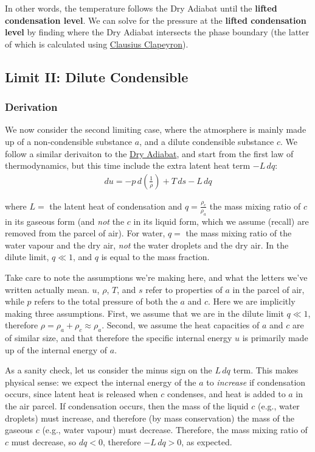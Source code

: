 In other words, the temperature follows the Dry Adiabat until the \textbf{lifted condensation level}. We can solve for the pressure at the \textbf{lifted condensation level} by finding where the Dry Adiabat intersects the phase boundary (the latter of which is calculated using \hyperref[Clausius Clapeyron]{Clausius Clapeyron}).

\subsection{Limit II: Dilute Condensible}

\subsubsection{Derivation}

We now consider the second limiting case, where the atmosphere is mainly made up of a non-condensible substance $a$, and a dilute condensible substance $c$. We follow a similar derivaiton to the \hyperref[Dry Adiabat]{Dry Adiabat}, and start from the first law of thermodynamics, but this time include the extra latent heat term $-L\,dq$:
\begin{align}\label{1st law latent heat}
    du=-p\,d\left(\frac{1}{\rho}\right)+T\,ds-L\,dq
\end{align}

\noindent where $L=$ the latent heat of condensation and $q=\frac{\rho_c}{\rho_a}$ the mass mixing ratio of $c$ in its gaseous form (and \textit{not} the $c$ in its liquid form, which we assume (recall) are removed from the parcel of air). For water, $q=$ the mass mixing ratio of the water vapour and the dry air, \textit{not} the water droplets and the dry air. In the dilute limit, $q\ll 1$, and $q$ is equal to the mass fraction. 

Take care to note the assumptions we're making here, and what the letters we've written actually mean. $u$, $\rho$, $T$,  and $s$ refer to properties of $a$ in the parcel of air, while $p$ refers to the total pressure of both the $a$ and $c$. Here we are implicitly making three assumptions. First, we assume that we are in the dilute limit $q\ll 1$, therefore $\rho=\rho_a+\rho_c\approx\rho_a$. Second, we assume the heat capacities of $a$ and $c$ are of similar size, and that therefore the specific internal energy $u$ is primarily made up of the internal energy of $a$.

As a sanity check, let us consider the minus sign on the $L\,dq$ term. This makes physical sense: we expect the internal energy of the $a$ to \textit{increase} if condensation occurs, since latent heat is released when $c$ condenses, and heat is added to $a$ in the air parcel. If condensation occurs, then the mass of the liquid $c$ (e.g., water droplets) must increase, and therefore (by mass conservation) the mass of the gaseous $c$ (e.g., water vapour) must decrease. Therefore, the mass mixing ratio of $c$ must decrease, so $dq<0$, therefore $-L\,dq>0$, as expected.


